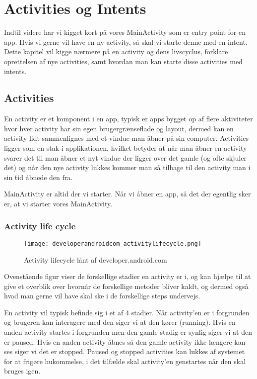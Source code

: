\chapter{Activities og Intents}
\label{cha:activities-intents}

Indtil videre har vi kigget kort på vores MainActivity som er entry point for en app. Hvis vi gerne vil have en ny activity, så skal vi starte denne med en intent. Dette kapitel vil kigge nærmere på en activity og dens livscyclus, forklare oprettelsen af nye activities, samt hvordan man kan starte disse activities med intents.

\section{Activities}

En activity er et komponent i en app, typisk er apps bygget op af flere aktiviteter hvor hver activity har sin egen brugergrænseflade og layout, dermed kan en activity lidt sammenlignes med et vindue man åbner på sin computer. Activities ligger som en stak i applikationen, hvilket betyder at når man åbner en activity svarer det til man åbner et nyt vindue der ligger over det gamle (og ofte skjuler det) og når den nye activity lukkes kommer man så tilbage til den activity man i sin tid åbnede den fra.

MainActivity er altid der vi starter. Når vi åbner en app, så det der egentlig sker er, at vi starter vores MainActivity.


\subsection{Activity life cycle}

\begin{figure}[H]
	\begin{center}
		\texttt{[image: developerandroidcom\_activitylifecycle.png]}
		\caption{Activity lifecycle lånt af developer.android.com}
		\label{fig:android:activities:activitylifecycle}
	\end{center}
\end{figure}

Ovenstående figur viser de forskellige stadier en activity er i, og kan hjælpe til at give et overblik over hvornår de forskellige metoder bliver kaldt, og dermed også hvad man gerne vil have skal ske i de forskellige steps undervejs.

En activity vil typisk befinde sig i et af 4 stadier. Når activity'en er i forgrunden og brugeren kan interagere med den siger vi at den kører (running). Hvis en anden activity startes i forgrunden men den gamle stadig er synlig siger vi at den er paused. Hvis en anden activity åbnes så den gamle activity ikke længere kan ses siger vi det er stopped. Paused og stopped activities kan lukkes af systemet for at frigøre hukommelse, i det tilfælde skal activity'en genstartes når den skal bruges igen.

